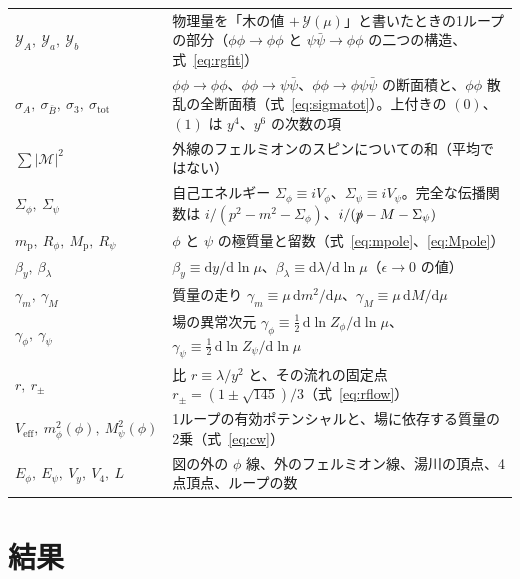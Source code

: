 \documentclass[a4paper,10pt]{ltjsarticle}
\newcommand{\dd}{\mathrm{d}}
\begin{document}
\begin{table}[tbp]
\begin{tabularx}{\linewidth}{>{\raggedright\arraybackslash}p{3.6cm}X}
$\mathcal Y_A,\ \mathcal Y_a,\ \mathcal Y_b$ & 物理量を「木の値 $+\,\mathcal Y(\mu)$」と書いたときの1ループの部分（$\phi\phi\to\phi\phi$ と $\psi\bar\psi\to\phi\phi$ の二つの構造、式~\eqref{eq:rgfit}） \\
$\sigma_A,\ \sigma_{\bar B},\ \sigma_3,\ \sigma_{\mathrm{tot}}$ & $\phi\phi\to\phi\phi$、$\phi\phi\to\psi\bar\psi$、$\phi\phi\to\phi\psi\bar\psi$ の断面積と、$\phi\phi$ 散乱の全断面積（式~\eqref{eq:sigmatot}）。上付きの $(0)$、$(1)$ は $y^4$、$y^6$ の次数の項 \\
$\sum|\mathcal{M}|^2$ & 外線のフェルミオンのスピンについての和（平均ではない） \\
$\Sigma_\phi,\ \Sigma_\psi$ & 自己エネルギー $\Sigma_\phi\equiv iV_\phi$、$\Sigma_\psi\equiv iV_\psi$。完全な伝播関数は $i/(p^2-m^2-\Sigma_\phi)$、$i/(\slashed p-M-\Sigma_\psi)$ \\
$m_{\mathrm p},\ R_\phi,\ M_{\mathrm p},\ R_\psi$ & $\phi$ と $\psi$ の極質量と留数（式~\eqref{eq:mpole}、\eqref{eq:Mpole}） \\
$\beta_y,\ \beta_\lambda$ & $\beta_y\equiv\dd y/\dd\ln\mu$、$\beta_\lambda\equiv\dd\lambda/\dd\ln\mu$（$\epsilon\to0$ の値） \\
$\gamma_m,\ \gamma_M$ & 質量の走り $\gamma_m\equiv\mu\,\dd m^2/\dd\mu$、$\gamma_M\equiv\mu\,\dd M/\dd\mu$ \\
$\gamma_\phi,\ \gamma_\psi$ & 場の異常次元 $\gamma_\phi\equiv\frac12\,\dd\ln Z_\phi/\dd\ln\mu$、$\gamma_\psi\equiv\frac12\,\dd\ln Z_\psi/\dd\ln\mu$ \\
$r,\ r_\pm$ & 比 $r\equiv\lambda/y^2$ と、その流れの固定点 $r_\pm=(1\pm\sqrt{145})/3$（式~\eqref{eq:rflow}） \\
$V_{\mathrm{eff}},\ m_\phi^2(\phi),\ M_\psi^2(\phi)$ & 1ループの有効ポテンシャルと、場に依存する質量の2乗（式~\eqref{eq:cw}） \\
$E_\phi,\ E_\psi,\ V_y,\ V_4,\ L$ & 図の外の $\phi$ 線、外のフェルミオン線、湯川の頂点、4点頂点、ループの数 \\
\bottomrule
\end{tabularx}
\end{table}

\section{結果}\label{sec:results}
\end{document}
